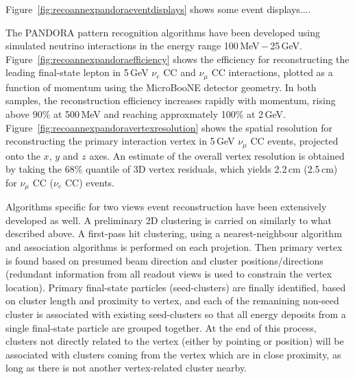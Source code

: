 
Figure~\ref{fig:recoannexpandoraeventdisplays} shows some event displays....

The PANDORA pattern recognition algorithms have been developed
using simulated neutrino interactions in the energy range 100\,MeV\,$-$\,25\,GeV.
Figure~\ref{fig:recoannexpandoraefficiency} shows the efficiency for reconstructing
the leading final-state lepton in 5\,GeV $\nu_{e}$ CC and $\nu_{\mu}$ CC interactions,
plotted as a function of momentum using the MicroBooNE detector geometry.
In both samples, the reconstruction efficiency increases rapidly with momentum,
rising above 90\% at 500\,MeV and reaching approxmately 100\% at 2\,GeV.
Figure~\ref{fig:recoannexpandoravertexresolution} shows the spatial resolution for
reconstructing the primary interaction vertex in 5\,GeV $\nu_{\mu}$ CC events,
projected onto the $x$, $y$ and $z$ axes. An estimate of the overall vertex 
resolution is obtained by taking the 68\% quantile of 3D vertex residuals, 
which yields 2.2\,cm (2.5\,cm) for $\nu_{\mu}$ CC ($\nu_{e}$ CC) events.



Algorithms specific for two views event reconstruction have been extensively developed as well. 
A preliminary 2D clustering is carried on similarly to what described above.
A first-pass hit clustering, using a nearest-neighbour algorithm and association algorithms is performed
on each projetion. Then primary vertex is found based on presumed beam direction and cluster positions/directions
(redundant information from all readout views is used to constrain the vertex location).
Primary final-state particles (seed-clusters) are finally identified, based on cluster length and proximity to vertex,
and each of the remanining non-seed cluster is associated with existing seed-clusters so that all energy deposits from a single final-state particle are grouped together.
At the end of this process, clusters not directly related to the vertex (either by pointing or position) 
will be associated with clusters coming from the vertex which are in close proximity, 
as long as there is not another vertex-related cluster nearby. 

